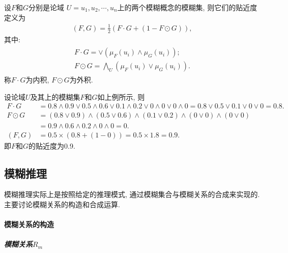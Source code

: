 设$F$和$G$分别是论域 $U={u_1, u_2, \cdots, u_n}$上的两个模糊概念的模糊集, 则它们的贴近度定义为
\begin{align}
  (F, G)=\frac 1 2( F\cdot G+(1-F\odot G)),
\end{align}
其中:
\begin{align}
\begin{array}{l}
F \cdot G=\vee\left(\mu_{F}\left(u_{i}\right) \wedge \mu_{G}\left(u_{i}\right)\right);\\
F \odot G=\bigwedge_{U}\left(\mu_{F}\left(u_{i}\right) \vee \mu_{G}\left(u_{i}\right)\right).
\end{array}
\end{align}
称$F\cdot G$为内积, $F\odot G$为外积.
\begin{example}
设论域$U$及其上的模糊集$F$和$G$如上例所示, 则
\begin{align*}
F\cdot G&=0.8\wedge 0.9\vee 0.5\wedge 0.6\vee 0.1\wedge 0.2 \vee  0\wedge 0\vee  0\wedge 0=0.8\vee 0.5\vee 0.1 \vee  0 \vee  0=0.8.\\
F\odot G&= (0.8\vee 0.9)\wedge (0.5\vee 0.6)\wedge (0.1\vee 0.2) \wedge (0\vee 0) \wedge (0\vee 0)\\
        &=0.9\wedge 0.6\wedge 0.2\wedge 0\wedge 0 =0.\\
(F, G)&=0.5\times (0.8+(1-0))=0.5\times 1.8=0.9.
\end{align*}
即$F$和$G$的贴近度为0.9.
\end{example}

\subsection{模糊推理}
模糊推理实际上是按照给定的推理模式, 通过模糊集合与模糊关系的合成来实现的. 主要讨论模糊关系的构造和合成运算.

\paragraph{模糊关系的构造}
\subparagraph{\textbf{模糊关系$R_m$}}

